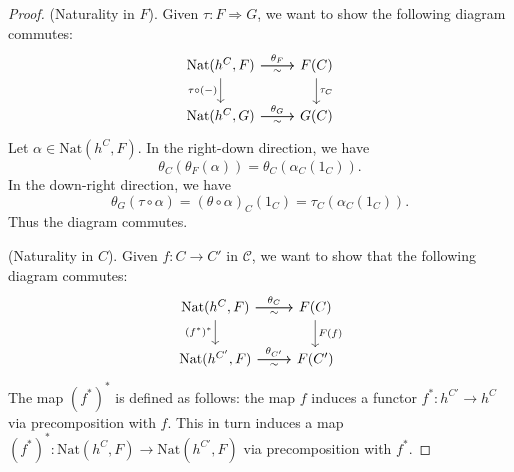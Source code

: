 \documentclass[12pt]{article}
\begin{document}
\begin{proof}
	(Naturality in $F$). Given $\tau: F\Rightarrow G$, we want to show the following diagram commutes:
	\begin{equation*}
\begin{tikzcd}
{\text{Nat}(h^C,F)} \arrow[d, "\tau\circ (-)"'] \arrow[r, "\theta_F"] \arrow[r, "\sim"'] & F(C) \arrow[d, "\tau_C"] \\
{\text{Nat}(h^C,G)} \arrow[r, "\theta_G"] \arrow[r, "\sim"']                             & G(C)                    
\end{tikzcd}
	\end{equation*}
	Let $\alpha\in \text{Nat}(h^C, F)$. In the right-down direction, we have 
	\begin{equation*}
		\theta_C(\theta_F(\alpha)) = \theta_C(\alpha_C(1_C)).
	\end{equation*}
	In the down-right direction, we have 
	\begin{equation*}
		\theta_G(\tau\circ\alpha)=(\theta\circ\alpha)_C(1_C)=\tau_C(\alpha_C(1_C)).
	\end{equation*}
	Thus the diagram commutes.

	(Naturality in $C$). Given $f:C\to C'$ in $\mathcal{C}$, we want to show that the following diagram commutes:
	\begin{equation*}
\begin{tikzcd}
{\text{Nat}(h^C,F)} \arrow[d, "(f^\ast)^\ast"'] \arrow[r, "\theta_C"] \arrow[r, "\sim"'] & F(C) \arrow[d, "F(f)"] \\
{\text{Nat}(h^{C'},F)} \arrow[r, "\theta_{C'}"] \arrow[r, "\sim"']                          & F(C')                 
\end{tikzcd}
	\end{equation*}
	The map $(f^\ast)^\ast$ is defined as follows: the map $f$ induces a functor $f^\ast:h^{C'}\to h^C$ via precomposition with $f$. This in turn induces a map $(f^\ast)^\ast:\text{Nat}(h^C,F)\to \text{Nat}(h^{C'},F)$ via precomposition with $f^\ast$. 


\end{proof}
\end{document}

